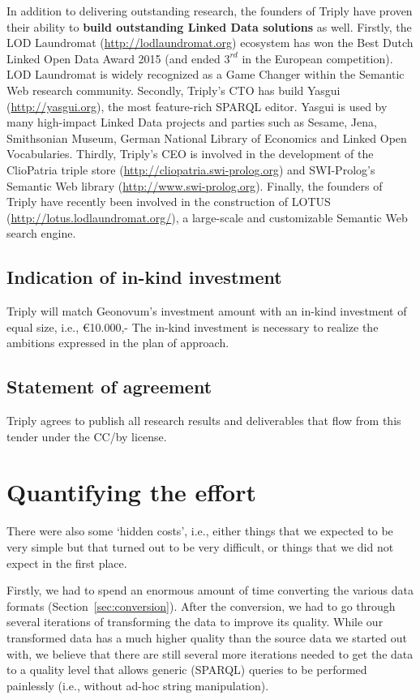 \documentclass[a4paper]{scrartcl}
\begin{document}
In addition to delivering outstanding research, the founders of Triply
have proven their ability to \textbf{build outstanding Linked Data
  solutions} as well.  Firstly, the LOD Laundromat
(\url{http://lodlaundromat.org}) ecosystem has won the Best Dutch
Linked Open Data Award 2015 (and ended $3^{rd}$ in the European
competition).  LOD Laundromat is widely recognized as a Game Changer
within the Semantic Web research community.  Secondly, Triply’s CTO
has build Yasgui (\url{http://yasgui.org}), the most feature-rich
SPARQL editor.  Yasgui is used by many high-impact Linked Data
projects and parties such as Sesame, Jena, Smithsonian Museum, German
National Library of Economics and Linked Open Vocabularies.  Thirdly,
Triply’s CEO is involved in the development of the ClioPatria triple
store (\url{http://cliopatria.swi-prolog.org}) and SWI-Prolog’s
Semantic Web library (\url{http://www.swi-prolog.org}).  Finally, the
founders of Triply have recently been involved in the construction of
LOTUS (\url{http://lotus.lodlaundromat.org/}), a large-scale and
customizable Semantic Web search engine.


\subsection{Indication of in-kind investment}

Triply will match Geonovum’s investment amount with an in-kind
investment of equal size, i.e., \euro{}10.000,- The in-kind investment
is necessary to realize the ambitions expressed in the plan of
approach.


\subsection{Statement of agreement}

Triply agrees to publish all research results and deliverables that
flow from this tender under the CC/by license.


\section{Quantifying the effort}

There were also some `hidden costs', i.e., either things that we
expected to be very simple but that turned out to be very difficult,
or things that we did not expect in the first place.

Firstly, we had to spend an enormous amount of time converting the
various data formats (Section~\ref{sec:conversion}).  After the
conversion, we had to go through several iterations of transforming
the data to improve its quality.  While our transformed data has a
much higher quality than the source data we started out with, we
believe that there are still several more iterations needed to get the
data to a quality level that allows generic (SPARQL) queries to be
performed painlessly (i.e., without ad-hoc string manipulation).
\end{document}
